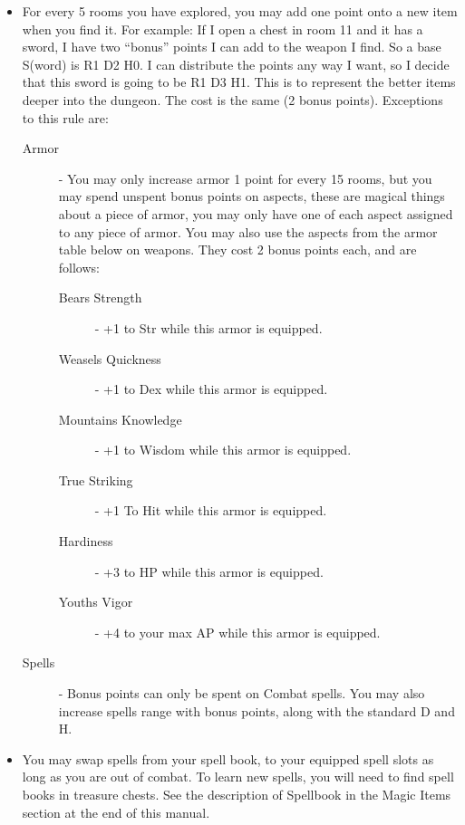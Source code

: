 \documentclass[a6paper,hidelinks]{article}
\begin{document}
\begin{itemize}
\item For every 5 rooms you have explored, you may add one point onto a new item when you find it. For example: If I open a chest in room 11 and it has a
sword, I have two “bonus” points I can add to the weapon I find. So a base S(word) is R1 D2 H0. I can distribute the points any way I want, so I decide
that this sword is going to be R1 D3 H1. This is to represent the better items deeper into the dungeon. The cost is the same (2 bonus points). Exceptions
to this rule are:

\begin{description}
\item[Armor] - You may only increase armor 1 point for every 15 rooms, but you may spend unspent bonus points on aspects, these are magical things about a piece of armor, you may only have one of each aspect assigned to any piece of armor. You may also use the aspects from the armor table below on weapons. They cost 2 bonus points each, and are follows:
\begin{description}
\item[Bears Strength] - +1 to Str while this armor is equipped.
\item[Weasels Quickness] - +1 to Dex while this armor is equipped.
\item[Mountains Knowledge] - +1 to Wisdom while this armor is equipped.
\item[True Striking] - +1 To Hit while this armor is equipped.
\item[Hardiness] - +3 to HP while this armor is equipped.
\item[Youths Vigor] - +4 to your max AP while this armor is equipped.
\end{description}

\item[Spells] - Bonus points can only be spent on Combat spells. You may also increase spells range with bonus points, along with the standard D and H.

\end{description}

\item You may swap spells from your spell book, to your equipped spell slots as long as you are out of combat. To learn new spells, you will need to find spell books in treasure chests. See the description of Spellbook in the Magic Items section at the end of this manual.

\end{itemize}
\end{document}
